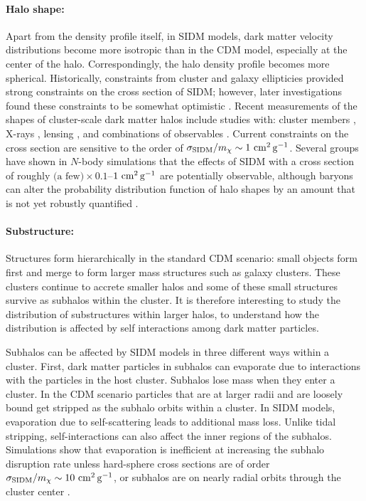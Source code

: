 \paragraph{Halo shape:} Apart from the density profile itself, in SIDM models, dark matter velocity distributions become more isotropic than in the CDM model, especially at the center of the halo.  Correspondingly,  the halo density profile becomes more spherical.  Historically, constraints from cluster and galaxy ellipticies \citep{Miralde-Escuda:2000} provided strong constraints on the cross section of SIDM; however, later investigations found these constraints to be somewhat optimistic \citep{Peter:2013}. 
Recent measurements of the shapes of cluster-scale dark matter halos include studies with: cluster members \citep{2018MNRAS.475.2421S},  X-rays \citep{Hashimoto:2007},  lensing \citep{Mandelbaum:2006, Evans:2009, Oguri:2010}, and combinations of observables \citep{Clampitt:2016, Sereno:2018}.  
Current constraints on the cross section are sensitive to the order of $\sigma_{\rm SIDM}/m_\chi \sim 1 \mathrm{\,\mathrm{\,cm}^2\mathrm{\,g}^{-1}}$.
Several groups have shown in $N$-body simulations that the effects of SIDM with a cross section of roughly $\text{(a few)}\times 0.1$--$1 \mathrm{\,\mathrm{\,cm}^2\mathrm{\,g}^{-1}}$ are potentially observable, although baryons can alter the probability distribution function of halo shapes by an amount that is not yet robustly quantified \citep[\eg][]{Peter:2013, Robertson:2017mgj, Brinckmann:2018}.


\paragraph{Substructure:} Structures form hierarchically in the standard CDM scenario: small objects form first and merge to form larger mass structures such as galaxy clusters. These clusters continue to accrete smaller halos and some of these small structures survive as subhalos within the cluster. It is therefore interesting to study the distribution of substructures within larger halos, to understand how the distribution is affected by self interactions among dark matter particles. 

Subhalos can be affected by SIDM models in three different ways within a cluster. First, dark matter particles in subhalos can evaporate due to interactions with the particles in the host cluster. Subhalos lose mass when they enter a cluster. In the CDM scenario particles that are at larger radii and are loosely bound get stripped as the subhalo orbits within a cluster. In SIDM models, evaporation due to self-scattering leads to additional mass loss. Unlike tidal stripping, self-interactions can also affect the inner regions of the subhalos. Simulations show that evaporation is inefficient at increasing the subhalo disruption rate unless hard-sphere cross sections are of order $\sigma_{\rm SIDM}/m_\chi \sim 10\mathrm{\,\mathrm{\,cm}^2\mathrm{\,g}^{-1}}$, or subhalos are on nearly radial orbits through the cluster center \citep{2012MNRAS.423.3740V,Rocha:2012jg,Dooley:2016ajo}. 

